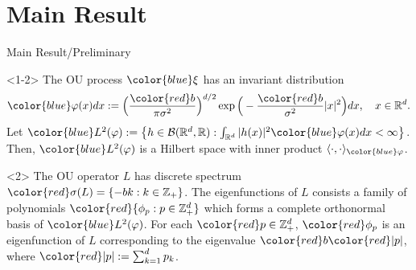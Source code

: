 \documentclass[xcolor=dvipsnames]{beamer}
\begin{document}
\section{Main Result}
\begin{frame}{Main Result/Preliminary}
\begin{block}{}<1-2>
The OU process ${\color{blue}\xi}$ has an {\color{PineGreen} invariant distribution}
$$
    {\color{blue}\varphi(x)}dx
    :=\Big (\frac{{\color{red}b}}{\pi \sigma^2}\Big )^{d/2}\exp \Big(-\frac{{\color{red}b}}{\sigma^2}|x|^2 \Big)dx,
    \quad x\in \mathbb R^d.
$$
    Let ${\color{blue}L^2(\varphi)}:= \left\{ h  \in \mathcal B(\mathbb R^d, \mathbb R): \int_{\mathbb R^d} |h(x)|^2 {\color{blue}\varphi(x)} dx < \infty \right\}$.
        Then, ${\color{blue}L^2(\varphi)}$ is a Hilbert space with inner product $\langle \cdot, \cdot \rangle_{\color{blue}\varphi}$.
\end{block}
\begin{block}{}<2>
The OU operator $L$ has discrete spectrum
$\color{red}\sigma(L)= \{-bk: k \in \mathbb Z_+\}$.
The eigenfunctions of $L$ consists a family of polynomials $\color{red}\{\phi_p:p\in \mathbb Z_+^d\}$ which forms a {\color{PineGreen}complete orthonormal basis} of ${\color{blue}L^2(\varphi)}$.
For each $\color{red}p\in \mathbb Z_+^d$, 
${\color{red}\phi_p}$ is an eigenfunction of $L$ corresponding to the eigenvalue ${\color{red}b}{\color{red}|p|}$, where $\color{red}|p|:= \sum_{k=1}^d p_k$. 
\end{block}
\end{frame}
\end{document}
